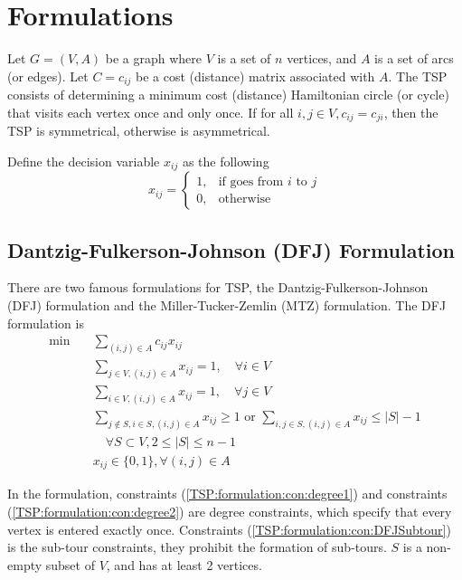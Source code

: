 			\section{Formulations}
				Let $G = (V, A)$ be a graph where $V$ is a set of $n$ vertices, and $A$ is a set of arcs (or edges). Let $C = c_{ij}$ be a cost (distance) matrix associated with $A$. The TSP consists of determining a minimum cost (distance) Hamiltonian circle (or cycle) that visits each vertex once and only once. If for all $i, j \in V, c_{ij} = c_{ji}$, then the TSP is symmetrical, otherwise is asymmetrical.

				Define the decision variable $x_{ij}$ as the following
				\begin{equation}
					x_{ij} = \begin{cases}1, &\text{if goes from } i \text{ to } j\\ 0, & \text{otherwise}\end{cases}
				\end{equation}

				\subsection{Dantzig-Fulkerson-Johnson (DFJ) Formulation}
					There are two famous formulations for TSP, the Dantzig-Fulkerson-Johnson (DFJ) formulation and the Miller-Tucker-Zemlin (MTZ) formulation. The DFJ formulation is
					\begin{align}
						\min \quad &\sum_{(i, j)\in A} c_{ij}x_{ij} \\
						& \sum_{j \in V, (i,j)\in A} x_{ij} = 1, \quad \forall i \in V \label{TSP:formulation:con:degree1}\\
						& \sum_{i \in V, (i,j)\in A} x_{ij} = 1, \quad \forall j \in V \label{TSP:formulation:con:degree2}\\
						& \sum_{j\notin S, i\in S, (i,j)\in A} x_{ij} \ge 1 \text{ or } \sum_{i, j \in S, (i, j) \in A} x_{ij} \le |S| - 1 \nonumber \\
						& \quad \forall S \subset V, 2\le |S| \le n-1 \label{TSP:formulation:con:DFJSubtour}\\
						& x_{ij} \in \{0, 1\}, \forall (i, j) \in A 
					\end{align}

					In the formulation, constraints (\ref{TSP:formulation:con:degree1}) and constraints (\ref{TSP:formulation:con:degree2}) are degree constraints, which specify that every vertex is entered exactly once. Constraints (\ref{TSP:formulation:con:DFJSubtour}) is the sub-tour constraints, they prohibit the formation of sub-tours. $S$ is a non-empty subset of $V$, and has at least 2 vertices. 

